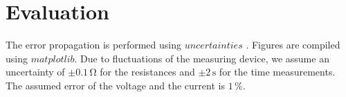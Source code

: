 \section{Evaluation}
\label{sec:Auswertung}



The error propagation is performed using $uncertainties$ \cite{unp}.
Figures are compiled using $matplotlib$\cite{Hunter:2007}. Due to fluctuations of the measuring device, we assume an uncertainty of
$\pm 0.1 \, \unit{\ohm}$ for the resistances and $\pm 2 \, \unit{\second} $ for the time measurements. 
The assumed error of the voltage and the current is $1 \, \%$.
